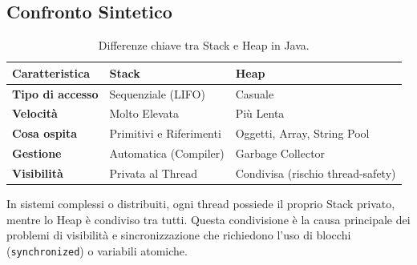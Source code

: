 \subsection{Confronto Sintetico}
\begin{table}[ht!]
\centering
\renewcommand{\arraystretch}{1.2}
\begin{tabular}{@{}lll@{}}
\toprule
\textbf{Caratteristica} & \textbf{Stack} & \textbf{Heap} \\ \midrule
\textbf{Tipo di accesso} & Sequenziale (LIFO) & Casuale \\
\textbf{Velocità} & Molto Elevata & Più Lenta \\
\textbf{Cosa ospita} & Primitivi e Riferimenti & Oggetti, Array, String Pool \\
\textbf{Gestione} & Automatica (Compiler) & Garbage Collector \\
\textbf{Visibilità} & Privata al Thread & Condivisa (rischio thread-safety) \\ \bottomrule
\end{tabular}
\caption{Differenze chiave tra Stack e Heap in Java.}
\end{table}

\begin{warningbox}
    In sistemi complessi o distribuiti, ogni thread possiede il proprio Stack privato, mentre lo Heap è condiviso tra tutti. Questa condivisione è la causa principale dei problemi di visibilità e sincronizzazione che richiedono l'uso di blocchi (\texttt{synchronized}) o variabili atomiche.
\end{warningbox}
